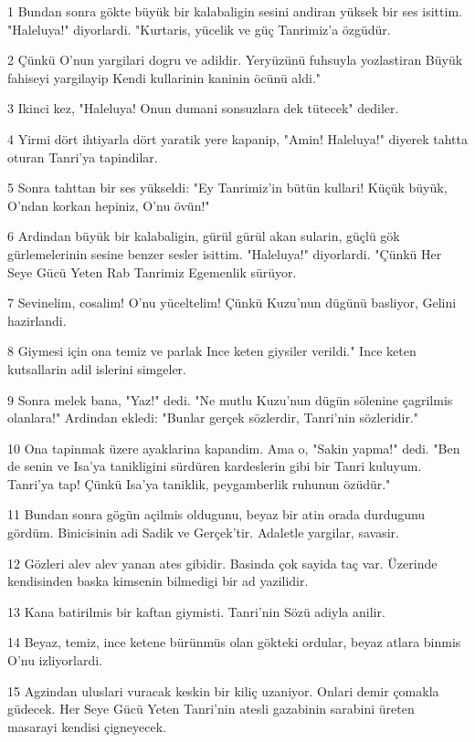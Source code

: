 \par 1 Bundan sonra gökte büyük bir kalabaligin sesini andiran yüksek bir ses isittim. "Haleluya!" diyorlardi. "Kurtaris, yücelik ve güç Tanrimiz'a özgüdür.
\par 2 Çünkü O'nun yargilari dogru ve adildir. Yeryüzünü fuhsuyla yozlastiran Büyük fahiseyi yargilayip Kendi kullarinin kaninin öcünü aldi."
\par 3 Ikinci kez, "Haleluya! Onun dumani sonsuzlara dek tütecek" dediler.
\par 4 Yirmi dört ihtiyarla dört yaratik yere kapanip, "Amin! Haleluya!" diyerek tahtta oturan Tanri'ya tapindilar.
\par 5 Sonra tahttan bir ses yükseldi: "Ey Tanrimiz'in bütün kullari! Küçük büyük, O'ndan korkan hepiniz, O'nu övün!"
\par 6 Ardindan büyük bir kalabaligin, gürül gürül akan sularin, güçlü gök gürlemelerinin sesine benzer sesler isittim. "Haleluya!" diyorlardi. "Çünkü Her Seye Gücü Yeten Rab Tanrimiz Egemenlik sürüyor.
\par 7 Sevinelim, cosalim! O'nu yüceltelim! Çünkü Kuzu'nun dügünü basliyor, Gelini hazirlandi.
\par 8 Giymesi için ona temiz ve parlak Ince keten giysiler verildi." Ince keten kutsallarin adil islerini simgeler.
\par 9 Sonra melek bana, "Yaz!" dedi. "Ne mutlu Kuzu'nun dügün sölenine çagrilmis olanlara!" Ardindan ekledi: "Bunlar gerçek sözlerdir, Tanri'nin sözleridir."
\par 10 Ona tapinmak üzere ayaklarina kapandim. Ama o, "Sakin yapma!" dedi. "Ben de senin ve Isa'ya tanikligini sürdüren kardeslerin gibi bir Tanri kuluyum. Tanri'ya tap! Çünkü Isa'ya taniklik, peygamberlik ruhunun özüdür."
\par 11 Bundan sonra gögün açilmis oldugunu, beyaz bir atin orada durdugunu gördüm. Binicisinin adi Sadik ve Gerçek'tir. Adaletle yargilar, savasir.
\par 12 Gözleri alev alev yanan ates gibidir. Basinda çok sayida taç var. Üzerinde kendisinden baska kimsenin bilmedigi bir ad yazilidir.
\par 13 Kana batirilmis bir kaftan giymisti. Tanri'nin Sözü adiyla anilir.
\par 14 Beyaz, temiz, ince ketene bürünmüs olan gökteki ordular, beyaz atlara binmis O'nu izliyorlardi.
\par 15 Agzindan uluslari vuracak keskin bir kiliç uzaniyor. Onlari demir çomakla güdecek. Her Seye Gücü Yeten Tanri'nin atesli gazabinin sarabini üreten masarayi kendisi çigneyecek.
